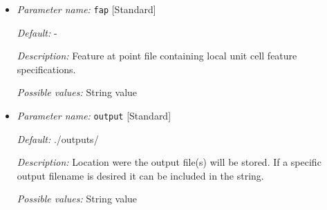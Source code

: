\begin{itemize}[itemsep=0.8em, parsep=0.3em]
	{\it Possible values:} String value
	
	\item {\it Parameter name:} {\tt fap} \hfill [Standard]
	\label{parameters:fap}
	
	
	{\it Default:} -
	
	{\it Description:} Feature at point file containing local unit cell feature specifications.
	
	{\it Possible values:} String value
	
	\item {\it Parameter name:} {\tt output} \hfill [Standard]
	\label{parameters:output}
	
	
	{\it Default:} ./outputs/
	
	{\it Description:} Location were the output file(s) will be stored. If a specific output filename is desired it can be included in the string.
	
	{\it Possible values:} String value
\end{itemize}

